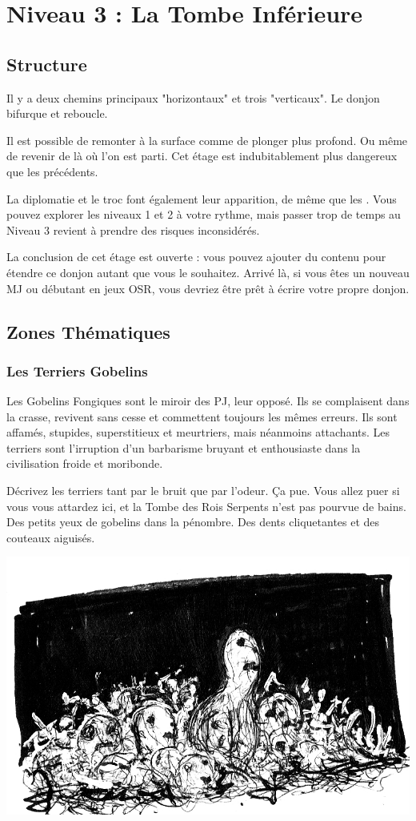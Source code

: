\chapter{Niveau 3 : La Tombe Inférieure}\label{n3}
\section{Structure}
Il y a deux chemins principaux "horizontaux" et trois "verticaux".
Le donjon bifurque et reboucle.

Il est possible de remonter à la surface comme de plonger plus profond.
Ou même de revenir de là où l'on est parti.
Cet étage est indubitablement plus dangereux que les précédents.

La diplomatie et le troc font également leur apparition, de même que les .
Vous pouvez explorer les niveaux 1 et 2 à votre rythme, mais passer trop de temps au Niveau 3 revient à prendre des risques inconsidérés.

La conclusion de cet étage est ouverte : vous pouvez ajouter du contenu pour étendre ce donjon autant que vous le souhaitez.
Arrivé là, si vous êtes un nouveau MJ ou débutant en jeux OSR, vous devriez être prêt à écrire votre propre donjon.

\section{Zones Thématiques}
\subsection{Les Terriers Gobelins}
Les Gobelins Fongiques sont le miroir des PJ, leur opposé.
Ils se complaisent dans la crasse, revivent sans cesse et commettent toujours les mêmes erreurs.
Ils sont affamés, stupides, superstitieux et meurtriers, mais néanmoins attachants.
Les terriers sont l'irruption d'un barbarisme bruyant et enthousiaste dans la civilisation froide et moribonde.



Décrivez les terriers tant par le bruit que par l'odeur.
Ça pue.
Vous allez puer si vous vous attardez ici, et la Tombe des Rois Serpents n'est pas pourvue de bains.
Des petits yeux de gobelins dans la pénombre.
Des dents cliquetantes et des couteaux aiguisés.

\ifmulticolEnd
\begin{center}
  \includegraphics[width=0.5\columnwidth]{pics/goblin_pit.jpg}
\end{center}
\ifmulticolStart


